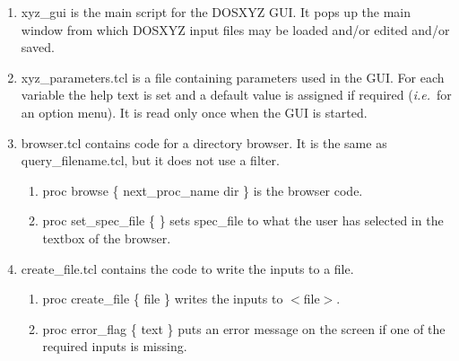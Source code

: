 \documentclass[12pt]{book}
\newcommand{\ie}{{\em i.e.}}
\begin{document}
\begin{enumerate}
\item xyz\_gui is the main script for the DOSXYZ GUI.  It pops up the
main window from which DOSXYZ input files may be loaded and/or edited
and/or saved.

\item xyz\_parameters.tcl is a file containing parameters used in the
GUI.  For each variable the help text is set and a default value is
assigned if required (\ie~for an option menu).  It is read only once
when the GUI is started.

\item browser.tcl contains code for a directory browser.  It is the same
as query\_filename.tcl, but it does not use a filter.
\begin{enumerate}
\item proc browse \{ next\_proc\_name dir \} is the browser code.
\item proc set\_spec\_file \{ \} sets spec\_file to what the user has
selected in the textbox of the browser.
\end{enumerate}

\item create\_file.tcl contains the code to write the inputs to a file.
\begin{enumerate}
\item proc create\_file \{ file \} writes the inputs to $<$file$>$.
\item proc error\_flag \{ text \} puts an error message on the screen if
one of the required inputs is missing.
\end{enumerate}


\end{enumerate}
\end{document}
